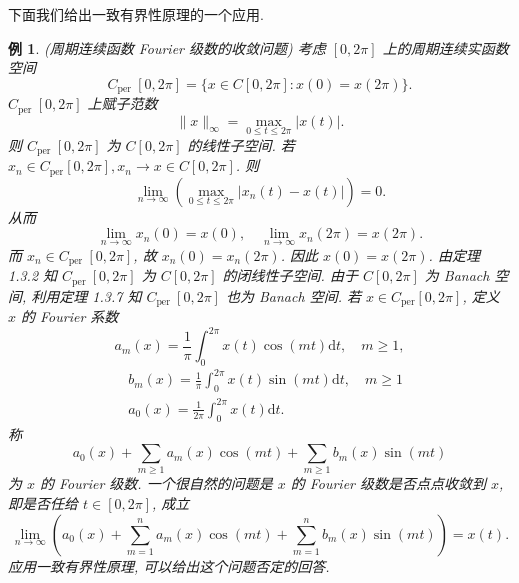 \documentclass[openany]{ctexbook}
\theoremstyle{kaiti}
\theoremstyle{normal}
\newtheorem{example}{例}[section]
\begin{document}
下面我们给出一致有界性原理的一个应用.

\begin{example}
(周期连续函数 Fourier 级数的收敛问题) 考虑 $[0,2 \pi]$ 上的周期连续实函数空间
$$
C_{\text {per }}[0,2 \pi]=\{x \in C[0,2 \pi]: x(0)=x(2 \pi)\}.
$$
$C_{\text {per }}[0,2 \pi]$ 上赋子范数
$$
\|x\|_{\infty}=\max_{0 \leqslant t \leqslant 2 \pi}|x(t)|.
$$
则 $C_{\text {per }}[0,2 \pi]$ 为 $C[0,2 \pi]$ 的线性子空间. 若 $x_n \in C_{\mathrm{per}}[0,2 \pi], x_n \rightarrow x \in C[0,2 \pi]$. 则
$$
\lim_{n \rightarrow \infty}\left(\max_{0 \leqslant t \leqslant 2 \pi}\left|x_n(t)-x(t)\right|\right)=0.
$$
从而
$$
\lim_{n \rightarrow \infty} x_n(0)=x(0), \quad \lim_{n \rightarrow \infty} x_n(2 \pi)=x(2 \pi).
$$
而 $x_n \in C_{\text {per }}[0,2 \pi]$, 故 $x_n(0)=x_n(2 \pi)$. 因此 $x(0)=x(2 \pi)$. 由定理 1.3.2 知 $C_{\text {per }}[0,2 \pi]$ 为 $C[0,2 \pi]$ 的闭线性子空间. 由于 $C[0,2 \pi]$ 为 Banach 空间, 利用定理 1.3.7 知 $C_{\text {per }}[0,2 \pi]$ 也为 Banach 空间.
若 $x \in C_{\mathrm{per}}[0,2 \pi]$, 定义 $x$ 的 Fourier 系数
$$
a_m(x)=\frac{1}{\pi} \int_0^{2 \pi} x(t) \cos (m t) \mathrm{d} t, \quad m \geqslant 1,
$$
$$
\begin{aligned}
&b_m(x)=\frac{1}{\pi} \int_0^{2 \pi} x(t) \sin (m t) \mathrm{d} t, \quad m \geqslant 1 \\
&a_0(x)=\frac{1}{2 \pi} \int_0^{2 \pi} x(t) \mathrm{d} t.
\end{aligned}
$$
称
$$
a_0(x)+\sum_{m \geqslant 1} a_m(x) \cos (m t)+\sum_{m \geqslant 1} b_m(x) \sin (m t)
$$
为 $x$ 的 Fourier 级数. 一个很自然的问题是 $x$ 的 Fourier 级数是否点点收敛到 $x$, 即是否任给 $t \in[0,2 \pi]$, 成立
$$
\lim_{n \rightarrow \infty}\left(a_0(x)+\sum_{m=1}^n a_m(x) \cos (m t)+\sum_{m=1}^n b_m(x) \sin (m t)\right)=x(t).
$$
应用一致有界性原理, 可以给出这个问题否定的回答. 


\end{example}
\end{document}
